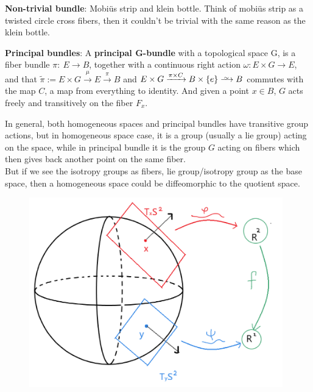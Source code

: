 \documentclass[12pt,twoside]{article}
\begin{document}
\textbf{Non-trivial bundle}: Mobiüs strip and klein bottle. Think of mobiüs strip as a twisted circle cross fibers, then it couldn't be trivial with the same reason as the klein bottle.

\newcommand{\iso}{\xrightarrow{
   \,\smash{\raisebox{-0.65ex}{\ensuremath{\scriptstyle\sim}}}\,}}
\begin{definition}
\textbf{Principal bundles}: A \textbf{principal G-bundle}\cite{Lawn} with a topological space G, is a fiber bundle $\pi:\ E\rightarrow B$, together with a continuous right action $\omega: E\times G \rightarrow E$, and that $\tilde{\pi}:= E\times G \xrightarrow{\mu} E \xrightarrow{\pi} B$ and $E\times G \xrightarrow{\pi \times C} B \times \{e \} \iso B$ commutes with the map $C$, a map from everything to identity. And given a point $x\in B$, $G$ acts freely and transitively on the fiber $F_{x}$.
\end{definition} 

In general, both homogeneous spaces and principal bundles have transitive group actions, but in homogeneous space case, it is a group (usually a lie group) acting on the space, while in principal bundle it is the group $G$ acting on fibers which then gives back another point on the same fiber.\\
But if we see the isotropy groups as fibers, lie group/isotropy group as the base space, then a homogeneous space could be diffeomorphic to the quotient space.


\begin{figure}[tb]
\centering
\includegraphics[width=110mm]{tangent to R.png} 
\caption{ \label{overflow}}
\end{figure}
\end{document}
